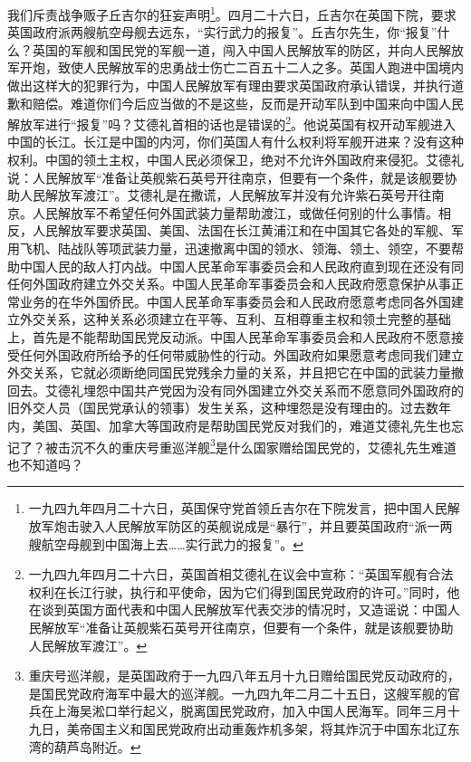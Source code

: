 \documentclass[cn,11pt,chinese]{elegantbook}
\begin{document}
我们斥责战争贩子丘吉尔的狂妄声明\footnote[2]{ 一九四九年四月二十六日，英国保守党首领丘吉尔在下院发言，把中国人民解放军炮击驶入人民解放军防区的英舰说成是“暴行”，并且要英国政府“派一两艘航空母舰到中国海上去……实行武力的报复”。}。四月二十六日，丘吉尔在英国下院，要求英国政府派两艘航空母舰去远东，“实行武力的报复”。丘吉尔先生，你“报复”什么？英国的军舰和国民党的军舰一道，闯入中国人民解放军的防区，并向人民解放军开炮，致使人民解放军的忠勇战士伤亡二百五十二人之多。英国人跑进中国境内做出这样大的犯罪行为，中国人民解放军有理由要求英国政府承认错误，并执行道歉和赔偿。难道你们今后应当做的不是这些，反而是开动军队到中国来向中国人民解放军进行“报复”吗？艾德礼首相的话也是错误的\footnote[3]{ 一九四九年四月二十六日，英国首相艾德礼在议会中宣称：“英国军舰有合法权利在长江行驶，执行和平使命，因为它们得到国民党政府的许可。”同时，他在谈到英国方面代表和中国人民解放军代表交涉的情况时，又造谣说：中国人民解放军“准备让英舰紫石英号开往南京，但要有一个条件，就是该舰要协助人民解放军渡江”。}。他说英国有权开动军舰进入中国的长江。长江是中国的内河，你们英国人有什么权利将军舰开进来？没有这种权利。中国的领土主权，中国人民必须保卫，绝对不允许外国政府来侵犯。艾德礼说：人民解放军“准备让英舰紫石英号开往南京，但要有一个条件，就是该舰要协助人民解放军渡江”。艾德礼是在撒谎，人民解放军并没有允许紫石英号开往南京。人民解放军不希望任何外国武装力量帮助渡江，或做任何别的什么事情。相反，人民解放军要求英国、美国、法国在长江黄浦江和在中国其它各处的军舰、军用飞机、陆战队等项武装力量，迅速撤离中国的领水、领海、领土、领空，不要帮助中国人民的敌人打内战。中国人民革命军事委员会和人民政府直到现在还没有同任何外国政府建立外交关系。中国人民革命军事委员会和人民政府愿意保护从事正常业务的在华外国侨民。中国人民革命军事委员会和人民政府愿意考虑同各外国建立外交关系，这种关系必须建立在平等、互利、互相尊重主权和领土完整的基础上，首先是不能帮助国民党反动派。中国人民革命军事委员会和人民政府不愿意接受任何外国政府所给予的任何带威胁性的行动。外国政府如果愿意考虑同我们建立外交关系，它就必须断绝同国民党残余力量的关系，并且把它在中国的武装力量撤回去。艾德礼埋怨中国共产党因为没有同外国建立外交关系而不愿意同外国政府的旧外交人员（国民党承认的领事）发生关系，这种埋怨是没有理由的。过去数年内，美国、英国、加拿大等国政府是帮助国民党反对我们的，难道艾德礼先生也忘记了？被击沉不久的重庆号重巡洋舰\footnote[4]{ 重庆号巡洋舰，是英国政府于一九四八年五月十九日赠给国民党反动政府的，是国民党政府海军中最大的巡洋舰。一九四九年二月二十五日，这艘军舰的官兵在上海吴淞口举行起义，脱离国民党政府，加入中国人民海军。同年三月十九日，美帝国主义和国民党政府出动重轰炸机多架，将其炸沉于中国东北辽东湾的葫芦岛附近。}是什么国家赠给国民党的，艾德礼先生难道也不知道吗？\\
\end{document}
